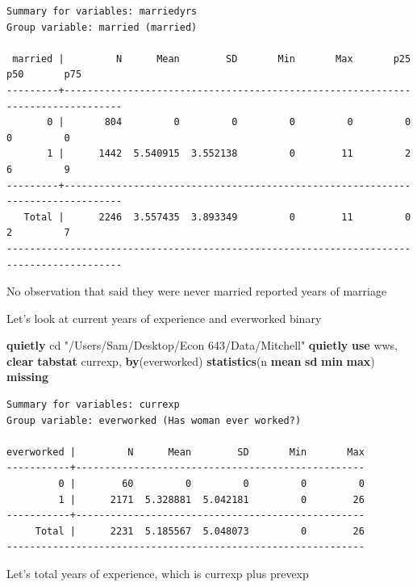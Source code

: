 \documentclass[
]{book}
\newenvironment{Shaded}{\begin{snugshade}}{\end{snugshade}}
\newcommand{\FunctionTok}[1]{\textcolor[rgb]{0.13,0.29,0.53}{\textbf{#1}}}
\newcommand{\KeywordTok}[1]{\textcolor[rgb]{0.13,0.29,0.53}{\textbf{#1}}}
\newcommand{\NormalTok}[1]{#1}
\newcommand{\StringTok}[1]{\textcolor[rgb]{0.31,0.60,0.02}{#1}}
\begin{document}
\begin{verbatim}
Summary for variables: marriedyrs
Group variable: married (married)

 married |         N      Mean        SD       Min       Max       p25       p50       p75
---------+--------------------------------------------------------------------------------
       0 |       804         0         0         0         0         0         0         0
       1 |      1442  5.540915  3.552138         0        11         2         6         9
---------+--------------------------------------------------------------------------------
   Total |      2246  3.557435  3.893349         0        11         0         2         7
------------------------------------------------------------------------------------------
\end{verbatim}

No observation that said they were never married reported years of marriage

Let's look at current years of experience and everworked binary

\begin{Shaded}
\begin{Highlighting}[]
\KeywordTok{quietly}\NormalTok{ cd }\StringTok{"/Users/Sam/Desktop/Econ 643/Data/Mitchell"}
\KeywordTok{quietly} \KeywordTok{use}\NormalTok{ wws, }\KeywordTok{clear}
\KeywordTok{tabstat}\NormalTok{ currexp, }\KeywordTok{by}\NormalTok{(everworked) }\KeywordTok{statistics}\NormalTok{(n }\KeywordTok{mean} \FunctionTok{sd} \FunctionTok{min} \FunctionTok{max}\NormalTok{) }\FunctionTok{missing}
\end{Highlighting}
\end{Shaded}

\begin{verbatim}
Summary for variables: currexp
Group variable: everworked (Has woman ever worked?)

everworked |         N      Mean        SD       Min       Max
-----------+--------------------------------------------------
         0 |        60         0         0         0         0
         1 |      2171  5.328881  5.042181         0        26
-----------+--------------------------------------------------
     Total |      2231  5.185567  5.048073         0        26
--------------------------------------------------------------
\end{verbatim}

Let's total years of experience, which is currexp plus prevexp
\end{document}
